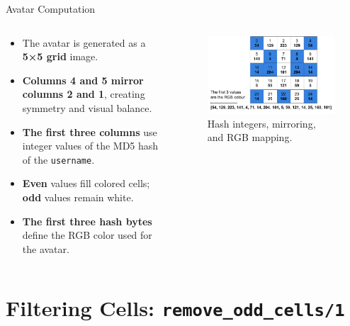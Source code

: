 \documentclass[aspectratio=169, table]{beamer}
\begin{document}
\begin{frame}[fragile]{Avatar Computation}
\begin{columns}[T,totalwidth=\textwidth]
  \begin{column}{0.4\textwidth}
    \small
    \begin{itemize}
      \item The avatar is generated as a \textbf{5×5 grid} image.
      \item \textbf{Columns 4 and 5 mirror columns 2 and 1}, creating symmetry and visual balance.
      \item \textbf{The first three columns} use integer values of the MD5 hash of the \texttt{username}.
      \item \textbf{Even} values fill colored cells; \textbf{odd} values remain white.
      \item \textbf{The first three hash bytes} define the RGB color used for the avatar.
    \end{itemize}
  \end{column}
\hfill
  \begin{column}{0.6\textwidth}
    \centering
    \begin{figure}
      \includegraphics[width=\linewidth]{../../assets/avatar-computation.pdf}
      \caption{Hash integers, mirroring, and RGB mapping.}
    \end{figure}
  \end{column}
\end{columns}
\end{frame}

\section{Filtering Cells: \texttt{remove\_odd\_cells/1}}
\end{document}
